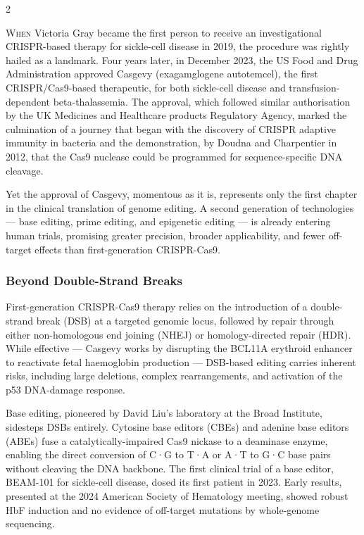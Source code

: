 \documentclass[a4paper,11pt]{article}
\newcommand{\dropcap}[2]{%
  \lettrine[lines=3, lhang=0.25, loversize=0.08, findent=3pt, nindent=0pt]{#1}{#2}%
}
\begin{document}
\begin{multicols}{2}

\dropcap{W}{hen} Victoria Gray became the first person to receive an
investigational CRISPR-based therapy for sickle-cell disease in 2019, the
procedure was rightly hailed as a landmark. Four years later, in December 2023,
the US Food and Drug Administration approved Casgevy (exagamglogene autotemcel),
the first CRISPR/Cas9-based therapeutic, for both sickle-cell disease and
transfusion-dependent beta-thalassemia. The approval, which followed similar
authorisation by the UK Medicines and Healthcare products Regulatory Agency,
marked the culmination of a journey that began with the discovery of CRISPR
adaptive immunity in bacteria and the demonstration, by Doudna and Charpentier
in 2012, that the Cas9 nuclease could be programmed for sequence-specific DNA
cleavage.

\medskip
Yet the approval of Casgevy, momentous as it is, represents only the first
chapter in the clinical translation of genome editing. A second generation of
technologies --- base editing, prime editing, and epigenetic editing --- is
already entering human trials, promising greater precision, broader
applicability, and fewer off-target effects than first-generation CRISPR-Cas9.

\subsubsection{Beyond Double-Strand Breaks}

First-generation CRISPR-Cas9 therapy relies on the introduction of a
double-strand break (DSB) at a targeted genomic locus, followed by repair
through either non-homologous end joining (NHEJ) or homology-directed repair
(HDR). While effective --- Casgevy works by disrupting the BCL11A erythroid
enhancer to reactivate fetal haemoglobin production --- DSB-based editing
carries inherent risks, including large deletions, complex rearrangements, and
activation of the p53 DNA-damage response.

\medskip
Base editing, pioneered by David Liu's laboratory at the Broad Institute,
sidesteps DSBs entirely. Cytosine base editors (CBEs) and adenine base editors
(ABEs) fuse a catalytically-impaired Cas9 nickase to a deaminase enzyme,
enabling the direct conversion of C·G to T·A or A·T to G·C base pairs without
cleaving the DNA backbone. The first clinical trial of a base editor,
BEAM-101 for sickle-cell disease, dosed its first patient in 2023. Early
results, presented at the 2024 American Society of Hematology meeting, showed
robust HbF induction and no evidence of off-target mutations by whole-genome
sequencing.


\end{multicols}
\end{document}
